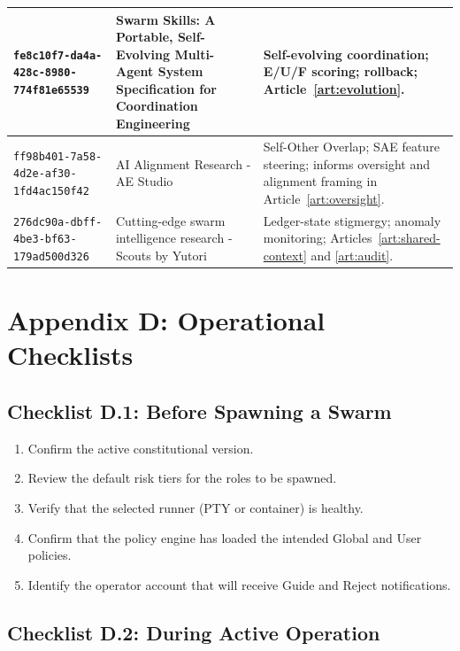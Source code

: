 \documentclass[12pt,letterpaper]{article}
\begin{document}
\begin{longtable}{|p{3cm}|p{5cm}|p{5.5cm}|}
\hline
\texttt{fe8c10f7-da4a-428c-8980-774f81e65539} & Swarm Skills: A Portable, Self-Evolving Multi-Agent System Specification for Coordination Engineering & Self-evolving coordination; E/U/F scoring; rollback; Article~\ref{art:evolution}. \\
\hline
\texttt{ff98b401-7a58-4d2e-af30-1fd4ac150f42} & AI Alignment Research - AE Studio & Self-Other Overlap; SAE feature steering; informs oversight and alignment framing in Article~\ref{art:oversight}. \\
\hline
\texttt{276dc90a-dbff-4be3-bf63-179ad500d326} & Cutting-edge swarm intelligence research - Scouts by Yutori & Ledger-state stigmergy; anomaly monitoring; Articles~\ref{art:shared-context} and \ref{art:audit}. \\
\hline
\end{longtable}

\section{Appendix D: Operational Checklists}
\label{appendix:checklists}

\subsection{Checklist D.1: Before Spawning a Swarm}

\begin{enumerate}
    \item Confirm the active constitutional version.
    \item Review the default risk tiers for the roles to be spawned.
    \item Verify that the selected runner (PTY or container) is healthy.
    \item Confirm that the policy engine has loaded the intended Global and User policies.
    \item Identify the operator account that will receive Guide and Reject notifications.
\end{enumerate}

\subsection{Checklist D.2: During Active Operation}
\end{document}
